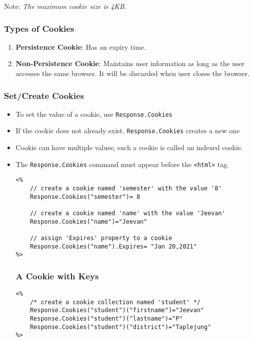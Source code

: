 \noindent Note: \emph{The maximum cookie size is 4KB.}

\subsubsection{Types of  Cookies}
\begin{enumerate}
	\item \textbf{Persistence Cookie}: Has an expiry time.
	\item \textbf{Non-Persistence Cookie}: Maintains user information as long as the user accesses the same browser. It will be discarded when user closes the browser.
\end{enumerate}

\subsubsection{Set/Create Cookies}
\begin{itemize}
	\item To set the value of a cookie, use \verb*|Response.Cookies|
	\item If the cookie does not already exist, \verb*|Response.Cookies| creates a new one
	\item Cookie can have multiple values; such a cookie is called an indexed cookie.
	\item The \verb*|Response.Cookies| command must appear before the \verb*|<html>| tag.
\begin{lstlisting}
<%
	// create a cookie named 'semester' with the value '8'
	Response.Cookies("semester")= 8
	
	// create a cookie named 'name' with the value 'Jeevan'
	Response.Cookies("name")="Jeevan"
	
	// assign 'Expires' property to a cookie
	Response.Cookies("name").Expires= "Jan 20,2021"
%>
\end{lstlisting}

\subsubsection*{A Cookie with Keys}
\begin{lstlisting}
<%
	/* create a cookie collection named 'student' */
	Response.Cookies("student")("firstname")="Jeevan"
	Response.Cookies("student")("lastname")="P"
	Response.Cookies("student")("district")="Taplejung"
%>
\end{lstlisting}

\end{itemize}

